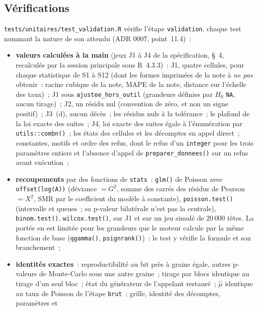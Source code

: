 \documentclass[a4paper,11pt]{article}
\newcommand{\code}[1]{\texttt{\small #1}}
\begin{document}
\subsection{Vérifications}
\label{sec:validation-verifications}

{\sloppy{} \code{tests/unitaires/test\_validation.R} vérifie l'étape \code{validation},
chaque test nommant la nature de son attendu (ADR 0007, point~11.4)~:
\begin{itemize}[leftmargin=*, itemsep=2pt]
  \item \textbf{valeurs calculées à la main} (jeux J1 à J4 de la
    spécification, §~4, recalculés par la session principale sous
    R~4.3.3)~: J1, quatre cellules, pour chaque statistique de S1 à S12
    (dont les formes imprimées de la note à \emph{ne pas} obtenir~: racine
    cubique de la note, MAPE de la note, distance sur l'échelle des taux)~;
    J1 sous \code{ajustee\_hors\_outil} (grandeurs définies par $H_0$
    \code{NA}, aucun tirage)~; J2, un résidu nul (convention de zéro, et non
    un signe positif)~; J3~(d), aucun décès~; les résidus nuls à la
    tolérance~; le plafond de la loi exacte des suites~; J4, loi exacte des
    suites égale à l'énumération par \code{utils::combn()}~; les états des
    cellules et les décomptes en appel direct~; constantes, motifs et ordre
    des refus, dont le refus d'un \code{integer} pour les trois paramètres
    entiers et l'absence d'appel de \code{preparer\_donnees()} sur un refus
    avant exécution~;
  \item \textbf{recoupements} par des fonctions de \code{stats}~:
    \code{glm()} de Poisson avec \code{offset(log(A))} (déviance $= G^2$,
    somme des carrés des résidus de Pearson $= X^2$, SMR par le
    coefficient du modèle à constante), \code{poisson.test()} (intervalle et
    queues~; sa p-valeur bilatérale n'est pas la centrale),
    \code{binom.test()}, \code{wilcox.test()}, sur J1 et sur un jeu simulé
    de 20\,000 têtes. La portée en est limitée pour les grandeurs que le
    moteur calcule par la même fonction de base (\code{qgamma()},
    \code{psignrank()})~: le test y vérifie la formule et son branchement~;
  \item \textbf{identités exactes}~: reproductibilité au bit près à graine
    égale, autres p-valeurs de Monte-Carlo sous une autre graine~; tirage
    par blocs identique au tirage d'un seul bloc~; état du générateur de
    l'appelant restauré~; $\hat\mu$ identique au taux de Poisson de l'étape
    \code{brut}~; grille, identité des décomptes, paramètres et

\end{itemize}}
\end{document}
